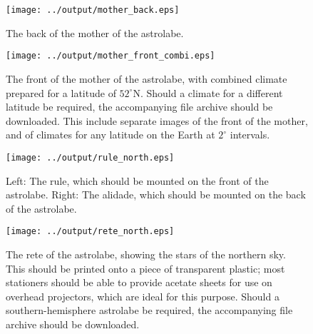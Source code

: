 \documentclass[a4paper,onecolumn,10pt]{article}
\begin{document}
\newpage

\begin{figure}
\centerline{\texttt{[image: ../output/mother\_back.eps]}}
\caption{The back of the mother of the astrolabe.}
\label{mother_back}
\end{figure}

\begin{figure}
\centerline{\texttt{[image: ../output/mother\_front\_combi.eps]}}
\caption{The front of the mother of the astrolabe, with combined climate prepared for a latitude of $52^\circ$N. Should a climate for a different latitude be required, the accompanying file archive should be downloaded. This include separate images of the front of the mother, and of climates for any latitude on the Earth at $2^\circ$ intervals.}
\label{mother_front}
\end{figure}

\begin{figure}
\centerline{\texttt{[image: ../output/rule\_north.eps]}}
\caption{Left: The rule, which should be mounted on the front of the astrolabe. Right: The alidade, which should be mounted on the back of the astrolabe.}
\label{rule}
\end{figure}

\begin{figure}
\centerline{\texttt{[image: ../output/rete\_north.eps]}}
\caption{The rete of the astrolabe, showing the stars of the northern sky. This should be printed onto a piece of transparent plastic; most stationers should be able to provide acetate sheets for use on overhead projectors, which are ideal for this purpose. Should a southern-hemisphere astrolabe be required, the accompanying file archive should be downloaded.}
\label{rete}
\end{figure}
\end{document}
